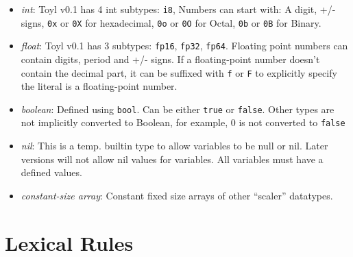 \documentclass[11pt]{book}
\begin{document}
\begin{itemize}
  \item \textit{int}: Toyl v0.1 has 4 int subtypes: \texttt{i8}, Numbers can start with: A digit, +/- signs, \texttt{0x} or \texttt{0X} for hexadecimal, \texttt{0o} or \texttt{0O} for Octal, \texttt{0b} or \texttt{0B} for Binary.

  \item \textit{float}: Toyl v0.1 has 3 subtypes: \texttt{fp16}, \texttt{fp32}, \texttt{fp64}. Floating point numbers can contain digits, period and +/- signs. If a floating-point number doesn't contain the decimal part, it can be suffixed with \texttt{f} or \texttt{F} to explicitly specify the literal is a floating-point number.

  \item \textit{boolean}: Defined using \texttt{bool}. Can be either \texttt{true} or \texttt{false}. Other types are not implicitly converted to Boolean, for example, 0 is not converted to \texttt{false}

  \item \textit{nil}: This is a temp. builtin type to allow variables to be null or nil. Later versions will not allow nil values for variables. All variables must have a defined values.

  \item \textit{constant-size array}: Constant fixed size arrays of other ``scaler'' datatypes.
\end{itemize}
\section{Lexical Rules}
\end{document}
